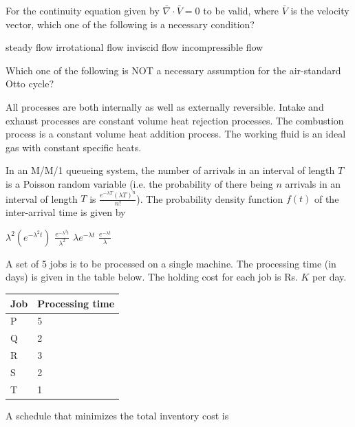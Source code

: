 \documentclass[addpoints,10pt]{exam}
\begin{document}
\begin{questions}
    \pagebreak

    \question For the continuity equation given by $\bar{\nabla}\cdot\bar{V} = 0$ to be valid, where $\bar{V}$ is the velocity vector, which one of the following is a necessary condition?

    \begin{choices}
        \choice steady flow
        \choice irrotational flow
        \choice inviscid flow
        \choice incompressible flow
    \end{choices}

    \question Which one of the following is NOT a necessary assumption for the air-standard Otto cycle?

    \begin{choices}
        \choice All processes are both internally as well as externally reversible.
        \choice Intake and exhaust processes are constant volume heat rejection processes.
        \choice The combustion process is a constant volume heat addition process.
        \choice The working fluid is an ideal gas with constant specific heats.
    \end{choices}

    \question In an M/M/1 queueing system, the number of arrivals in an interval of length $T$ is a Poisson random variable (i.e. the probability of there being $n$ arrivals in an interval of length $T$ is $\frac{e^{-\lambda T}(\lambda T)^n}{n!}$). The probability density function $f(t)$ of the inter-arrival time is given by

    \begin{oneparchoices}
        \choice $\lambda^2(e^{-\lambda^2t})$
        \choice $\frac{e^{-\lambda^2t}}{\lambda^2}$
        \choice $\lambda e^{-\lambda t}$
        \choice $\frac{e^{-\lambda t}}{\lambda}$
    \end{oneparchoices}

    \question A set of 5 jobs is to be processed on a single machine. The processing time (in days) is given in the table below. The holding cost for each job is Rs. $K$ per day.\\
    \begin{center}
    \begin{tabular}{|l|l|}
        \hline
        \textbf{Job} & \textbf{Processing time} \\
        \hline
        P & 5 \\\hline
        Q & 2 \\\hline
        R & 3 \\\hline
        S & 2 \\\hline
        T & 1 \\\hline
    \end{tabular}
    \end{center}
    A schedule that minimizes the total inventory cost is


\end{questions}
\end{document}
